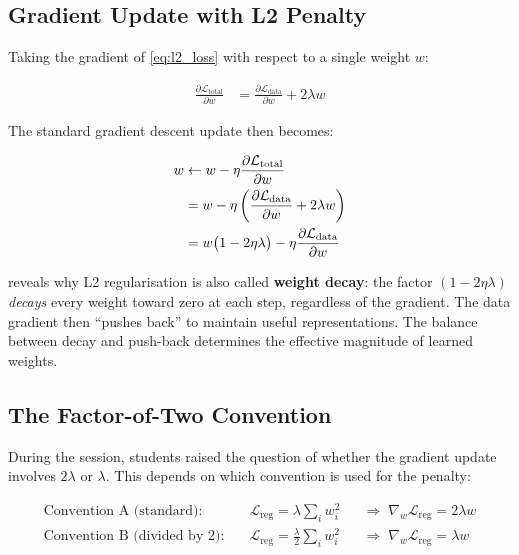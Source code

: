 \documentclass[12pt,a4paper]{article}
\newcommand{\Ltotal}{\mathcal{L}_{\mathrm{total}}}
\newcommand{\Ldata}{\mathcal{L}_{\mathrm{data}}}
\begin{document}
\subsection{Gradient Update with L2 Penalty}

Taking the gradient of \cref{eq:l2_loss} with respect to a single weight
$w$:

\begin{align}
  \frac{\partial \Ltotal}{\partial w}
    &= \frac{\partial \Ldata}{\partial w} + 2\lambda w
  \label{eq:l2_grad}
\end{align}

The standard gradient descent update then becomes:

\begin{align}
  w &\leftarrow w - \eta \frac{\partial \Ltotal}{\partial w} \notag \\
    &= w - \eta \left(\frac{\partial \Ldata}{\partial w} + 2\lambda w\right)
       \notag \\
    &= w\bigl(1 - 2\eta\lambda\bigr)
       - \eta \frac{\partial \Ldata}{\partial w}
  \label{eq:weight_decay_update}
\end{align}

\begin{keyinsight}
 reveals why L2 regularisation is also called
\textbf{weight decay}: the factor $(1 - 2\eta\lambda)$ \emph{decays} every
weight toward zero at each step, regardless of the gradient. The data
gradient then ``pushes back'' to maintain useful representations. The
balance between decay and push-back determines the effective magnitude of
learned weights.
\end{keyinsight}

\subsection{The Factor-of-Two Convention}

During the session, students raised the question of whether the gradient
update involves $2\lambda$ or $\lambda$. This depends on which convention
is used for the penalty:

\begin{align}
  \text{Convention A (standard):}\quad
    &\mathcal{L}_{\mathrm{reg}} = \lambda \sum_i w_i^2
    &&\Rightarrow\; \nabla_w \mathcal{L}_{\mathrm{reg}} = 2\lambda w
    \label{eq:conv_a} \\[4pt]
  \text{Convention B (divided by 2):}\quad
    &\mathcal{L}_{\mathrm{reg}} = \frac{\lambda}{2} \sum_i w_i^2
    &&\Rightarrow\; \nabla_w \mathcal{L}_{\mathrm{reg}} = \lambda w
    \label{eq:conv_b}
\end{align}
\end{document}

